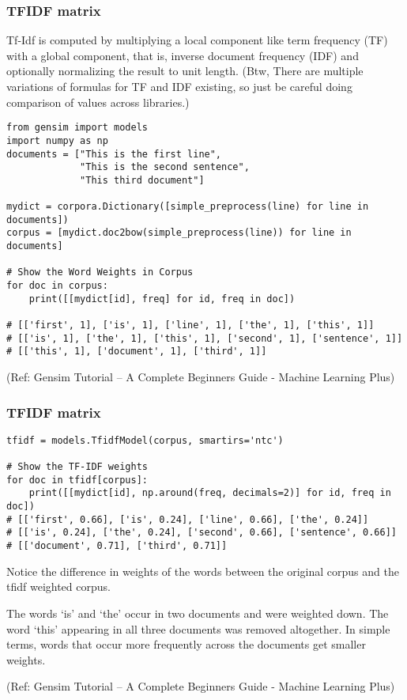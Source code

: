 \begin{frame}[fragile]\frametitle{TFIDF matrix}

Tf-Idf is computed by multiplying a local component like term frequency (TF) with a global component, that is, inverse document frequency (IDF) and optionally normalizing the result to unit length. (Btw, There are multiple variations of formulas for TF and IDF existing, so just be careful doing comparison of values across libraries.)

\begin{lstlisting}
from gensim import models
import numpy as np
documents = ["This is the first line",
             "This is the second sentence",
             "This third document"]

mydict = corpora.Dictionary([simple_preprocess(line) for line in documents])
corpus = [mydict.doc2bow(simple_preprocess(line)) for line in documents]

# Show the Word Weights in Corpus
for doc in corpus:
    print([[mydict[id], freq] for id, freq in doc])

# [['first', 1], ['is', 1], ['line', 1], ['the', 1], ['this', 1]]
# [['is', 1], ['the', 1], ['this', 1], ['second', 1], ['sentence', 1]]
# [['this', 1], ['document', 1], ['third', 1]]
\end{lstlisting}

\tiny{(Ref: Gensim Tutorial – A Complete Beginners Guide - Machine Learning Plus)}
\end{frame}

\begin{frame}[fragile]\frametitle{TFIDF matrix}

\begin{lstlisting}
tfidf = models.TfidfModel(corpus, smartirs='ntc')

# Show the TF-IDF weights
for doc in tfidf[corpus]:
    print([[mydict[id], np.around(freq, decimals=2)] for id, freq in doc])
# [['first', 0.66], ['is', 0.24], ['line', 0.66], ['the', 0.24]]
# [['is', 0.24], ['the', 0.24], ['second', 0.66], ['sentence', 0.66]]
# [['document', 0.71], ['third', 0.71]]
\end{lstlisting}

Notice the difference in weights of the words between the original corpus and the tfidf weighted corpus.

The words ‘is’ and ‘the’ occur in two documents and were weighted down. The word ‘this’ appearing in all three documents was removed altogether. In simple terms, words that occur more frequently across the documents get smaller weights.


\tiny{(Ref: Gensim Tutorial – A Complete Beginners Guide - Machine Learning Plus)}
\end{frame}


